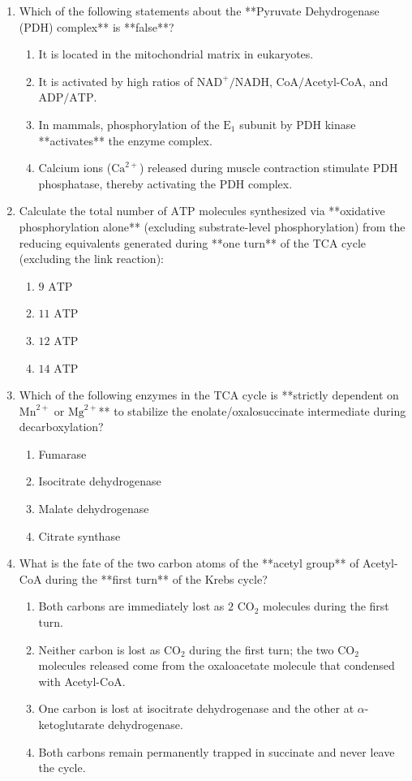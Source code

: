 \documentclass[11pt, a4paper]{article}
\begin{document}
\begin{enumerate}[label=\textbf{\arabic*.}]
\item Which of the following statements about the **Pyruvate Dehydrogenase (PDH) complex** is **false**?
\begin{enumerate}[label=(\Alph*)]
    \item It is located in the mitochondrial matrix in eukaryotes.
    \item It is activated by high ratios of $\text{NAD}^+/\text{NADH}$, $\text{CoA}/\text{Acetyl-CoA}$, and $\text{ADP}/\text{ATP}$.
    \item In mammals, phosphorylation of the $\text{E}_1$ subunit by PDH kinase **activates** the enzyme complex.
    \item Calcium ions ($\text{Ca}^{2+}$) released during muscle contraction stimulate PDH phosphatase, thereby activating the PDH complex.
\end{enumerate}

\item Calculate the total number of $\text{ATP}$ molecules synthesized via **oxidative phosphorylation alone** (excluding substrate-level phosphorylation) from the reducing equivalents generated during **one turn** of the TCA cycle (excluding the link reaction):
\begin{enumerate}[label=(\Alph*)]
    \item $9\text{ ATP}$
    \item $11\text{ ATP}$
    \item $12\text{ ATP}$
    \item $14\text{ ATP}$
\end{enumerate}

\item Which of the following enzymes in the TCA cycle is **strictly dependent on $\text{Mn}^{2+}$ or $\text{Mg}^{2+}$** to stabilize the enolate/oxalosuccinate intermediate during decarboxylation?
\begin{enumerate}[label=(\Alph*)]
    \item Fumarase
    \item Isocitrate dehydrogenase
    \item Malate dehydrogenase
    \item Citrate synthase
\end{enumerate}

\item What is the fate of the two carbon atoms of the **acetyl group** of Acetyl-CoA during the **first turn** of the Krebs cycle?
\begin{enumerate}[label=(\Alph*)]
    \item Both carbons are immediately lost as $2\text{ CO}_2$ molecules during the first turn.
    \item Neither carbon is lost as $\text{CO}_2$ during the first turn; the two $\text{CO}_2$ molecules released come from the oxaloacetate molecule that condensed with Acetyl-CoA.
    \item One carbon is lost at isocitrate dehydrogenase and the other at $\alpha$-ketoglutarate dehydrogenase.
    \item Both carbons remain permanently trapped in succinate and never leave the cycle.
\end{enumerate}


\end{enumerate}
\end{document}
